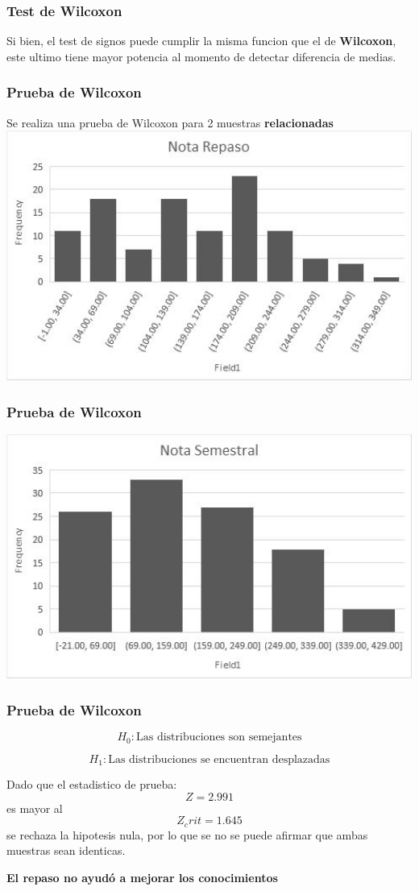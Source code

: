 \begin{frame}
    \frametitle{Test de Wilcoxon}
    Si bien, el test de signos puede cumplir la misma funcion que el de
    \textbf{Wilcoxon}, este ultimo tiene mayor potencia al momento de
    detectar diferencia de medias.
  
\end{frame}

\begin{frame}
    \frametitle{Prueba de Wilcoxon}
    Se realiza una prueba de Wilcoxon para 2 muestras
    \textbf{relacionadas} 
    \includegraphics[width=1\textwidth]{cap/images/wilcoxon/repaso.jpg}
\end{frame}

\begin{frame}
    \frametitle{Prueba de Wilcoxon}
    \includegraphics[width=1\textwidth]{cap/images/wilcoxon/semestral.jpg}
\end{frame}

\begin{frame}

    \frametitle{Prueba de Wilcoxon}

    \[H_0: \textrm{Las distribuciones son semejantes}\]
    
    \[H_1: \textrm{Las distribuciones se encuentran desplazadas}\]

    Dado que el estadistico de prueba: \[ Z = 2.991 \] es mayor al 
    \[Z_crit = 1.645\] se rechaza la hipotesis nula, por lo que se no
    se puede afirmar que ambas muestras sean identicas.

    \textbf{El repaso no ayudó a mejorar los conocimientos}
\end{frame}

